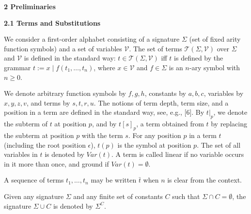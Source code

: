 
 
\par\medskip\noindent\textbf{2 Preliminaries}\par
 
 
\par\medskip\noindent\textbf{2.1 Terms and Substitutions}\par
 
 
We consider a first-order alphabet consisting of a signature $\Sigma$ (set of fixed arity function symbols) and a set of variables $\mathcal{V}$. The set of terms $\mathcal{T}(\Sigma,\mathcal{V})$ over $\Sigma$ and $\mathcal{V}$ is defined in the standard way: $t\in\mathcal{T}(\Sigma,\mathcal{V})$ iff $t$ is defined by the grammar $t:=x\mid f(t_{1},\ldots,t_{n})$, where $x\in\mathcal{V}$ and $f\in\Sigma$ is an $n$-ary symbol with $n\geq 0$.\par
 
 
 
We denote arbitrary function symbols by $f,g,h$, constants by $a,b,c$, variables by $x,y,z,v$, and terms by $s,t,r,u$. The notions of term depth, term size, and a position in a term are defined in the standard way, see, e.g., [6]. By $t|_{p}$, we denote the subterm of $t$ at position $p$, and by $t[s]_{p}$, a term obtained from $t$ by replacing the subterm at position $p$ with the term $s$. For any position $p$ in a term $t$ (including the root position $\epsilon$), $t(p)$ is the symbol at position $p$. The set of all variables in $t$ is denoted by $\mathit{Var}(t)$. A term is called linear if no variable occurs in it more than once, and ground if $\mathit{Var}(t)=\emptyset$.\par
 
 
 
A sequence of terms $t_{1},\dots,t_{n}$ may be written $\bar{t}$ when $n$ is clear from the context.\par
 
 
 
Given any signature $\Sigma$ and any finite set of constants $C$ such that $\Sigma\cap C=\emptyset$, the signature $\Sigma\cup C$ is denoted by ${\Sigma}^{C}$.\par
 
